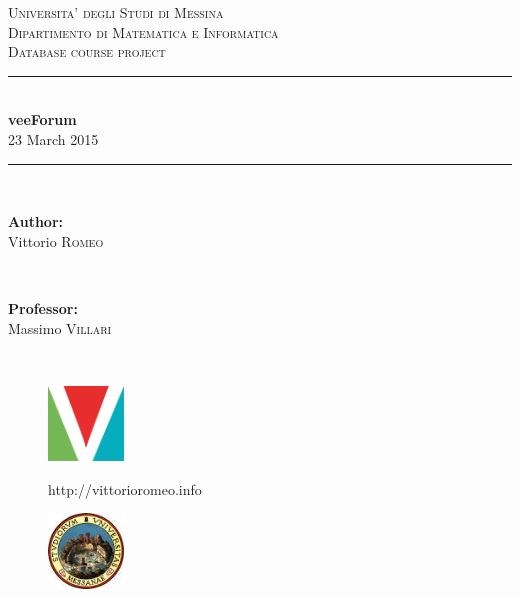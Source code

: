 \documentclass[12pt]{report}
\newcommand{\HRule}{\rule{\linewidth}{0.5mm}}
\renewcommand\emph{\textbf}
\begin{document}
    \begin{titlepage}

        \center

        \textsc{\LARGE Universita' degli Studi di Messina}\\[0.1cm] 
        \textsc{\Large Dipartimento di Matematica e Informatica}\\[0.5cm] 
        \textsc{\Large Database course project}\\[0.5cm] 

        \HRule \\[0.4cm]
        { \huge \bfseries veeForum}\\[0.1cm]

        {\large 23 March 2015}
        \HRule \\[1.5cm]
         
        \begin{minipage}{0.4\textwidth}
        \begin{flushleft} \large
        \emph{Author:}\\
        Vittorio \textsc{Romeo} %
        \end{flushleft}
        \end{minipage}
        ~
        \begin{minipage}{0.4\textwidth}
        \begin{flushright} \large
        \emph{Professor:} \\
        Massimo \textsc{Villari}

        
        \end{flushright}
        \end{minipage}\\[4cm]

        \vfill

        \begin{minipage}{\linewidth}
            \centering
            \begin{minipage}{0.35\linewidth}
                \begin{figure}[H]
                    \center
                    \includegraphics[width=2cm, height=2cm]{logovee}
                    
                    http://vittorioromeo.info
                \end{figure}
            \end{minipage}
            \hspace{0.27\linewidth}
            \begin{minipage}{0.35\linewidth}
                \begin{figure}[H]
                    \center
                    \includegraphics[width=2cm, height=2cm]{logounime}
                    

\end{figure}
\end{minipage}
\end{minipage}
\end{titlepage}
\end{document}
